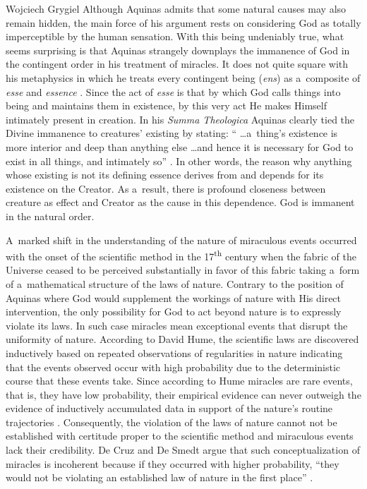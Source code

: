 \begin{artengenv}{Wojciech Grygiel}
Although Aquinas admits that some natural causes may also remain hidden, the main force of his argument rests on considering God as totally imperceptible by the human sensation. With this being undeniably true, what seems surprising is that Aquinas strangely downplays the immanence of God in the contingent order in his treatment of miracles. It does not quite square with his metaphysics in which he treats every contingent being (\textit{ens}) as a~composite of \textit{esse} and \textit{essence}
\parencite[][]{aquinas_being_1968}. %
 Since the act of \textit{esse} is that by which God calls things into being and maintains them in existence, by this very act He makes Himself intimately present in creation. In his \textit{Summa Theologica} Aquinas clearly tied the Divine immanence to creatures’ existing by stating: `` \ldots a~thing’s existence is more interior and deep than anything else \ldots and hence it is necessary for God to exist in all things, and intimately so'' 
\parencite[][\textit{Summa Theologica}, I.8.1]{aquinas_summa_1981}. %
 In other words, the reason why anything whose existing is not its defining essence derives from and depends for its existence on the Creator. As a~result, there is profound closeness between creature as effect and Creator as the cause in this dependence. God is immanent in the natural order.

A~marked shift in the understanding of the nature of miraculous events occurred with the onset of the scientific method in the 17\textsuperscript{th} century when the fabric of the Universe ceased to be perceived substantially in favor of this fabric taking a~form of a~mathematical structure of the laws of nature. Contrary to the position of Aquinas where God would supplement the workings of nature with His direct intervention, the only possibility for God to act beyond nature is to expressly violate its laws. In such case miracles mean exceptional events that disrupt the uniformity of nature. According to David Hume, the scientific laws are discovered inductively based on repeated observations of regularities in nature indicating that the events observed occur with high probability due to the deterministic course that these events take. Since according to Hume miracles are rare events, that is, they have low probability, their empirical evidence can never outweigh the evidence of inductively accumulated data in support of the nature’s routine trajectories
\parencite[][pp.79–95]{hume_enquiry_2008}. %
 Consequently, the violation of the laws of nature cannot not be established with certitude proper to the scientific method and miraculous events lack their credibility. De Cruz and De Smedt argue that such conceptualization of miracles is incoherent because if they occurred with higher probability, ``they would not be violating an established law of nature in the first place'' 
\parencite[][p.159]{de_cruz_natural_2015}.%



\end{artengenv}
